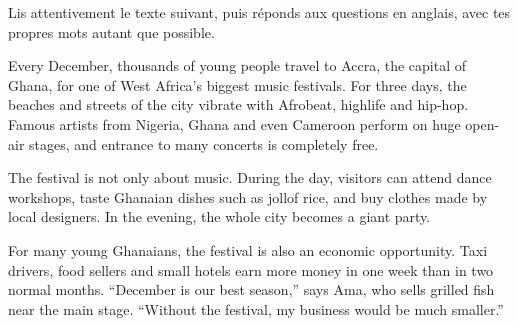 \documentclass[11pt]{article}
\begin{document}
\begin{exercice}
Lis attentivement le texte suivant, puis réponds aux questions en anglais, avec tes propres mots autant que possible.
\begin{textebox}
Every December, thousands of young people travel to Accra, the capital of Ghana, for one of West Africa's biggest music festivals. For three days, the beaches and streets of the city vibrate with Afrobeat, highlife and hip-hop. Famous artists from Nigeria, Ghana and even Cameroon perform on huge open-air stages, and entrance to many concerts is completely free.

The festival is not only about music. During the day, visitors can attend dance workshops, taste Ghanaian dishes such as jollof rice, and buy clothes made by local designers. In the evening, the whole city becomes a giant party.

For many young Ghanaians, the festival is also an economic opportunity. Taxi drivers, food sellers and small hotels earn more money in one week than in two normal months. “December is our best season,” says Ama, who sells grilled fish near the main stage. “Without the festival, my business would be much smaller.”


\end{textebox}
\end{exercice}
\end{document}
